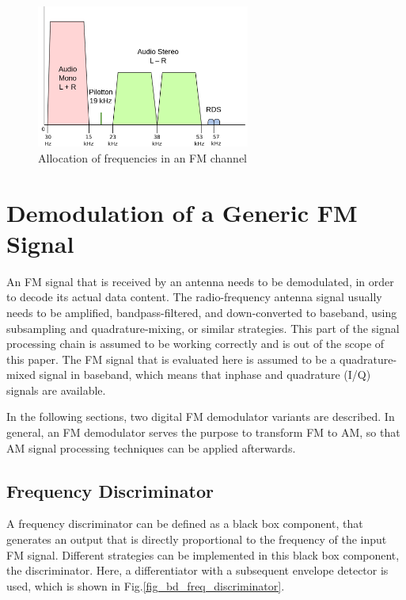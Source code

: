 \documentclass[conference]{IEEEtran}
\begin{document}
    \begin{figure}[!h]
      \centering
        \includegraphics[width=7cm]{img/fm-channel-baseband.png}
      \caption{Allocation of frequencies in an FM channel \cite{ref_fig_channel_freqs}}
      \label{fig_channel_baseband_freqs}
    \end{figure}


\section{Demodulation of a Generic FM Signal}
\label{sec_fm_sig_demod}
  An FM signal that is received by an antenna needs to be demodulated, in order to decode its actual data content.
  The radio-frequency antenna signal usually needs to be amplified, bandpass-filtered, and down-converted to baseband, using subsampling and quadrature-mixing, or similar strategies.
  This part of the signal processing chain is assumed to be working correctly and is out of the scope of this paper.
  The FM signal that is evaluated here is assumed to be a quadrature-mixed signal in baseband, which means that inphase and quadrature (I/Q) signals are available.


  In the following sections, two digital FM demodulator variants are described.
  In general, an FM demodulator serves the purpose to transform FM to AM, so that AM signal processing techniques can be applied afterwards.

  \subsection{Frequency Discriminator}
    A frequency discriminator can be defined as a black box component, that generates an output that is directly proportional to the frequency of the input FM signal.
    Different strategies can be implemented in this black box component, the discriminator.
    Here, a differentiator with a subsequent envelope detector is used, which is shown in Fig.\ref{fig_bd_freq_discriminator}.
\end{document}
